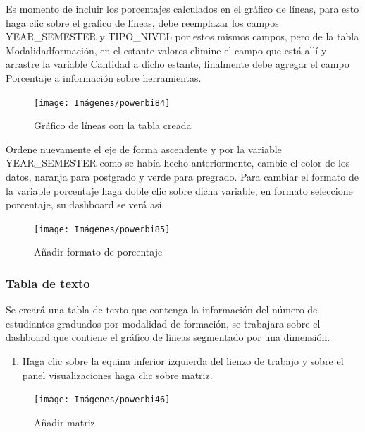 \documentclass[
]{book}
\providecommand{\tightlist}{%
  \setlength{\itemsep}{0pt}\setlength{\parskip}{0pt}}
\begin{document}
Es momento de incluir los porcentajes calculados en el gráfico de líneas, para esto haga clic sobre el grafico de líneas, debe reemplazar los campos YEAR\_SEMESTER y TIPO\_NIVEL por estos mismos campos, pero de la tabla Modalidadformación, en el estante valores elimine el campo que está allí y arrastre la variable Cantidad a dicho estante, finalmente debe agregar el campo Porcentaje a información sobre herramientas.

\begin{figure}

{\centering \texttt{[image: Imágenes/powerbi84]} 

}

\caption{Gráfico de líneas con la tabla creada}\label{fig:taableromodalidadformacion-fig}
\end{figure}

Ordene nuevamente el eje de forma ascendente y por la variable YEAR\_SEMESTER como se había hecho anteriormente, cambie el color de los datos, naranja para postgrado y verde para pregrado. Para cambiar el formato de la variable porcentaje haga doble clic sobre dicha variable, en formato seleccione porcentaje, su dashboard se verá así.

\begin{figure}

{\centering \texttt{[image: Imágenes/powerbi85]} 

}

\caption{Añadir formato de porcentaje}\label{fig:formatoporcentaje-fig}
\end{figure}

\hypertarget{tabladetextopowerbi}{%
\subsubsection{Tabla de texto}\label{tabladetextopowerbi}}

Se creará una tabla de texto que contenga la información del número de estudiantes graduados por modalidad de formación, se trabajara sobre el dashboard que contiene el gráfico de líneas segmentado por una dimensión.

\begin{enumerate}
\def\labelenumi{\arabic{enumi}.}
\tightlist
\item
  Haga clic sobre la equina inferior izquierda del lienzo de trabajo y sobre el panel visualizaciones haga clic sobre matriz.
\end{enumerate}

\begin{figure}

{\centering \texttt{[image: Imágenes/powerbi46]} 

}

\caption{Añadir matriz}\label{fig:paso1matriz-fig}
\end{figure}
\end{document}
